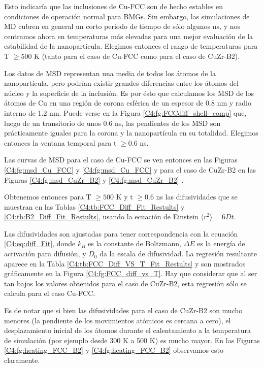 Esto indicaría que las inclusiones de Cu-FCC son de hecho estables en condiciones de operación normal para BMGs. Sin embargo, las simulaciones de MD cubren en general un corto periodo de tiempo de sólo algunos ns, y nos centramos ahora en temperaturas más elevadas para una mejor evaluación de la estabilidad de la nanopartícula. Elegimos entonces el rango de temperaturas para T $ \geq 500$ K (tanto para el caso de Cu-FCC como para el caso de CuZr-B2).

Los datos de MSD representan una media de todos los átomos de la nanopartícula, pero podrían existir grandes diferencias entre los átomos del núcleo y la superficie de la inclusión. Es por ésto que calculamos los MSD de los átomos de Cu en una región de corona esférica de un espesor de 0.8 nm y radio interno de 1.2 nm. Puede verse en la Figura \ref{C4:fg:FCCdiff_shell_comp} que, luego de un transitorio de unos 0.6 ns, las pendientes de los MSD son prácticamente iguales para la corona y la nanopartícula en su totalidad. Elegimos entonces la ventana temporal para t $ \geq 0.6 $ ns.

Las curvas de MSD para el caso de Cu-FCC se ven entonces en las Figuras \ref{C4:fg:msd_Cu_FCC}  y \ref{C4:fg:msd_Cu_FCC}  y para el caso de CuZr-B2 en las Figuras \ref{C4:fg:msd_CuZr_B2}  y \ref{C4:fg:msd_CuZr_B2} .

Obtenemos entonces para T $ \geq 500$ K y t $ \geq 0.6 $ ns las difusividades que se muestran en las Tablas \ref{C4:tb:FCC_Diff_Fit_Restults} y \ref{C4:tb:B2_Diff_Fit_Restults}, usando la ecuación de Einstein $\langle r^{2}\rangle = 6Dt$.

Las difusividades son ajustadas para tener correspondencia con la ecuación \ref{C4:eq:diff_Fit}, donde $k_{B}$ es la constante de Boltzmann, $\Delta E$ es la energía de activación para difusión, y $D_{0}$ da la escala de difusividad. La regresión resultante aparece en la Tabla \ref{C4:tb:FCC_Diff_VS_T_Fit_Restults} y son mostrados gráficamente en la Figura \ref{C4:fg:FCC_diff_vs_T}. Hay que considerar que al ser tan bajos los valores obtenidos para el caso de CuZr-B2, esta regresión sólo se calcula para el caso Cu-FCC.

Es de notar que si bien las difusividades para el caso de CuZr-B2 son mucho menores (la pendiente de los movimientos atómicos es cercana a cero), el desplazamiento inicial de los átomos durante el calentamiento a la temperatura de simulación (por ejemplo desde 300 K a 500 K) es mucho mayor. En las Figuras \ref{C4:fg:heating_FCC_B2}  y \ref{C4:fg:heating_FCC_B2}  observamos esto claramente.

